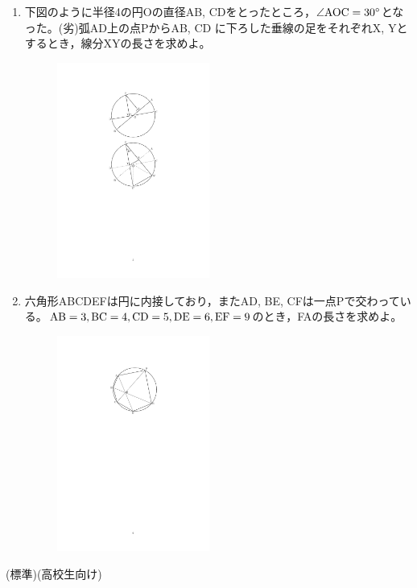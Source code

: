 \documentclass[a4paper,12pt,uplatex]{jsarticle}  %
\begin{document}
\begin{enumerate}
\item 下図のように半径4の円Oの直径AB, CDをとったところ，$\angle {\rm AOC}=30^{\circ}$となった。(劣)弧AD上の点PからAB, CD に下ろした垂線の足をそれぞれX, Yとするとき，線分XYの長さを求めよ。

\begin{figure}[h]
  \centering
  \includegraphics[width=5.0cm]{jizen_2_1_problem.pdf}
\end{figure}

\item 六角形ABCDEFは円に内接しており，またAD, BE, CFは一点Pで交わっている。${\rm AB}=3, {\rm BC}=4, {\rm CD}=5, {\rm DE}=6, {\rm EF}=9$のとき，FAの長さを求めよ。

\begin{figure}[h]
  \centering
  \includegraphics[width=5.0cm]{jizen_2_2_problem.pdf}
\end{figure}

\end{enumerate}

\bigskip

 (標準)(高校生向け)
\end{document}

